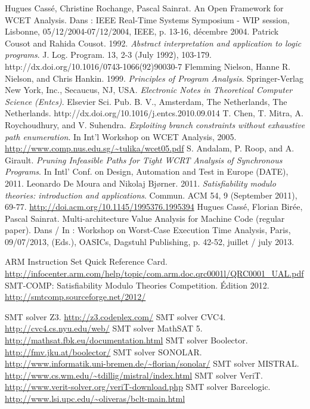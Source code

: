 \documentclass[french]{article}
\begin{document}
\newpage{}
%
\begin{thebibliography}{1}

    Hugues Cassé, Christine Rochange, Pascal Sainrat. An Open Framework for
    WCET Analysis. Dans : IEEE Real-Time Systems Symposium - WIP
    session, Lisbonne, 05/12/2004-07/12/2004, IEEE, p. 13-16, décembre 2004.
    Patrick Cousot and Rahida Cousot. 1992. \textit{Abstract interpretation and application to logic programs}. J. Log. Program. 13, 2-3 (July 1992), 103-179. http://dx.doi.org/10.1016/0743-1066(92)90030-7
    Flemming Nielson, Hanne R. Nielson, and Chris Hankin. 1999. \textit{Principles of Program Analysis}. Springer-Verlag New York, Inc., Secaucus, NJ, USA.
    \textit{Electronic Notes in Theoretical Computer Science (Entcs)}. Elsevier Sci. Pub. B. V., Amsterdam, The Netherlands, The Netherlands. http://dx.doi.org/10.1016/j.entcs.2010.09.014
     T. Chen, T. Mitra, A. Roychoudhury, and V. Suhendra. \textit{Exploiting branch constraints without exhaustive path enumeration}. In Int’l Workshop on WCET Analysis, 2005.
    \url{http://www.comp.nus.edu.sg/~tulika/wcet05.pdf}
    S. Andalam, P. Roop, and A. Girault. \textit{Pruning Infeasible Paths for Tight WCRT Analysis of Synchronous Programs}. In Intl’ Conf. on Design, Automation and Test in Europe (DATE), 2011.
    Leonardo De Moura and Nikolaj Bjørner. 2011. \textit{Satisfiability modulo theories: introduction and applications}. Commun. ACM 54, 9 (September 2011), 69-77.
    \url{http://doi.acm.org/10.1145/1995376.1995394}
    Hugues Cassé, Florian Birée, Pascal Sainrat. Multi-architecture Value Analysis for Machine Code (regular paper). Dans / In : Workshop on Worst-Case Execution Time Analysis, Paris, 09/07/2013, (Eds.), OASICs, Dagstuhl Publishing, p. 42-52, juillet / july 2013.

     ARM Instruction Set Quick Reference Card. \url{http://infocenter.arm.com/help/topic/com.arm.doc.qrc0001l/QRC0001_UAL.pdf}
     SMT-COMP: Satisfiability Modulo Theories Competition. Édition 2012. \url{http://smtcomp.sourceforge.net/2012/}

     SMT solver Z3. \url{http://z3.codeplex.com/}
     SMT solver CVC4. \url{http://cvc4.cs.nyu.edu/web/}
     SMT solver MathSAT 5. \url{http://mathsat.fbk.eu/documentation.html}
     SMT solver Boolector. \url{http://fmv.jku.at/boolector/}
     SMT solver SONOLAR. \url{http://www.informatik.uni-bremen.de/~florian/sonolar/}
     SMT solver MISTRAL. \url{http://www.cs.wm.edu/~tdillig/mistral/index.html}
     SMT solver VeriT. \url{http://www.verit-solver.org/veriT-download.php}
     SMT solver Barcelogic. \url{http://www.lsi.upc.edu/~oliveras/bclt-main.html}
\end{thebibliography}
\end{document}
